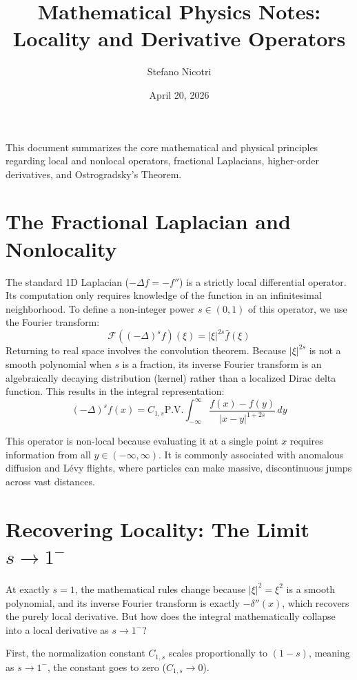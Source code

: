 \documentclass[11pt, a4paper]{article}
\title{Mathematical Physics Notes: Locality and Derivative Operators}
\author{Stefano Nicotri}
\date{April 20, 2026}
\begin{document}
\maketitle

This document summarizes the core mathematical and physical principles regarding local and nonlocal operators, fractional Laplacians, higher-order derivatives, and Ostrogradsky's Theorem.

\section{The Fractional Laplacian and Nonlocality}
The standard 1D Laplacian ($-\Delta f = -f''$) is a strictly local differential operator. Its computation only requires knowledge of the function in an infinitesimal neighborhood. To define a non-integer power $s \in (0, 1)$ of this operator, we use the Fourier transform:
\[
\mathcal{F}((-\Delta)^s f)(\xi) = |\xi|^{2s} \hat{f}(\xi)
\]
Returning to real space involves the convolution theorem. Because $|\xi|^{2s}$ is not a smooth polynomial when $s$ is a fraction, its inverse Fourier transform is an algebraically decaying distribution (kernel) rather than a localized Dirac delta function. This results in the integral representation:
\[
(-\Delta)^s f(x) = C_{1,s} \text{P.V.} \int_{-\infty}^{\infty} \frac{f(x) - f(y)}{|x - y|^{1+2s}} \, dy
\]
\begin{tcolorbox}[colback=blue!5!white, colframe=blue!75!black, title=Physical Meaning]
This operator is non-local because evaluating it at a single point $x$ requires information from all $y \in (-\infty, \infty)$. It is commonly associated with anomalous diffusion and Lévy flights, where particles can make massive, discontinuous jumps across vast distances.
\end{tcolorbox}

\section{Recovering Locality: The Limit $s \to 1^-$}
At exactly $s=1$, the mathematical rules change because $|\xi|^2 = \xi^2$ is a smooth polynomial, and its inverse Fourier transform is exactly $-\delta''(x)$, which recovers the purely local derivative. But how does the integral mathematically collapse into a local derivative as $s \to 1^-$?

First, the normalization constant $C_{1,s}$ scales proportionally to $(1-s)$, meaning as $s \to 1^-$, the constant goes to zero ($C_{1,s} \to 0$).
\end{document}
